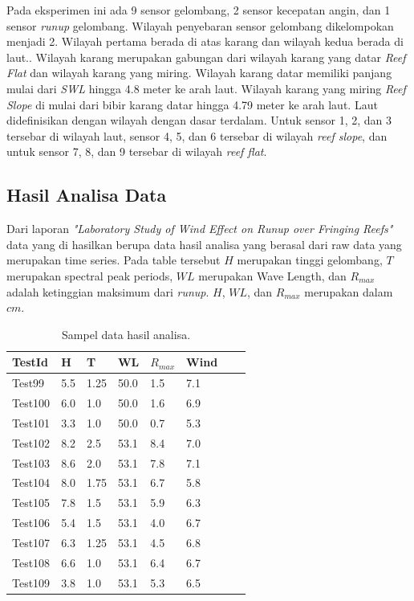 Pada eksperimen ini ada 9 sensor gelombang, 2 sensor kecepatan angin, dan 1 sensor \emph{runup} gelombang. Wilayah penyebaran sensor gelombang dikelompokan menjadi 2. Wilayah pertama berada di atas karang dan wilayah kedua berada di laut.. Wilayah karang merupakan gabungan dari wilayah karang yang datar \emph{Reef Flat} dan wilayah karang yang miring. Wilayah karang datar memiliki panjang mulai dari \emph{SWL} hingga 4.8 meter ke arah laut. Wilayah karang yang miring \emph{Reef Slope} di mulai dari bibir karang datar hingga 4.79 meter ke arah laut. Laut didefinisikan dengan wilayah dengan dasar terdalam. Untuk sensor 1, 2, dan 3 tersebar di wilayah laut, sensor 4, 5, dan 6 tersebar di wilayah \emph{reef slope}, dan untuk sensor 7, 8, dan 9 tersebar di wilayah \emph{reef flat}.

\pagebreak

\subsection{Hasil Analisa Data}

Dari laporan \emph{"Laboratory Study of Wind Effect on Runup over Fringing Reefs"} \cite{DemirbilekReport} data yang di hasilkan berupa data hasil analisa yang berasal dari raw data yang merupakan time series. Pada table tersebut $H$ merupakan tinggi gelombang, $T$ merupakan spectral peak periods, $WL$ merupakan Wave Length, dan $R_{max}$ adalah ketinggian maksimum dari \emph{runup}. $H$, $WL$, dan $R_{max}$ merupakan dalam $cm$.

\begin{table}
    \begin{center}
      \begin{tabular}{|l|l|l|l|l|l|l|l|}
      \hline
      TestId & H & T & WL & $R_{max}$ & Wind \\ \hline
      Test99 & 5.5 & 1.25 & 50.0 & 1.5 & 7.1 \\ \hline
      Test100 & 6.0 & 1.0 & 50.0 & 1.6 & 6.9 \\ \hline
      Test101 & 3.3 & 1.0 & 50.0 & 0.7 & 5.3 \\ \hline
      Test102 & 8.2 & 2.5 & 53.1 & 8.4 & 7.0 \\ \hline
      Test103 & 8.6 & 2.0 & 53.1 & 7.8 & 7.1 \\ \hline
      Test104 & 8.0 & 1.75 & 53.1 & 6.7 & 5.8 \\ \hline
      Test105 & 7.8 & 1.5 & 53.1 & 5.9 & 6.3 \\ \hline
      Test106 & 5.4 & 1.5 & 53.1 & 4.0 & 6.7 \\ \hline
      Test107 & 6.3 & 1.25 & 53.1 & 4.5 & 6.8 \\ \hline
      Test108 & 6.6 & 1.0 & 53.1 & 6.4 & 6.7 \\ \hline
      Test109 & 3.8 & 1.0 & 53.1 & 5.3 & 6.5 \\ \hline
      \end{tabular}
    \end{center}
    \caption{Sampel data hasil analisa.}
  \end{table}
\FloatBarrier

